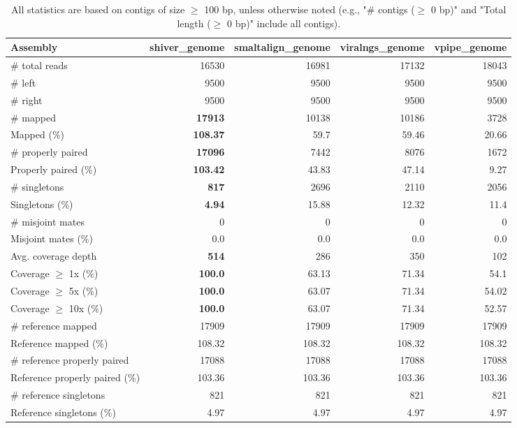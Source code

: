 \documentclass[12pt,a4paper]{article}
\begin{document}
\begin{table}[ht]
\begin{center}
\caption{All statistics are based on contigs of size $\geq$ 100 bp, unless otherwise noted (e.g., "\# contigs ($\geq$ 0 bp)" and "Total length ($\geq$ 0 bp)" include all contigs).}
\begin{tabular}{|l*{4}{|r}|}
\hline
Assembly & shiver\_genome & smaltalign\_genome & viralngs\_genome & vpipe\_genome \\ \hline
\# total reads & 16530 & 16981 & 17132 & 18043 \\ \hline
\# left & 9500 & 9500 & 9500 & 9500 \\ \hline
\# right & 9500 & 9500 & 9500 & 9500 \\ \hline
\# mapped & {\bf 17913} & 10138 & 10186 & 3728 \\ \hline
Mapped (\%) & {\bf 108.37} & 59.7 & 59.46 & 20.66 \\ \hline
\# properly paired & {\bf 17096} & 7442 & 8076 & 1672 \\ \hline
Properly paired (\%) & {\bf 103.42} & 43.83 & 47.14 & 9.27 \\ \hline
\# singletons & {\bf 817} & 2696 & 2110 & 2056 \\ \hline
Singletons (\%) & {\bf 4.94} & 15.88 & 12.32 & 11.4 \\ \hline
\# misjoint mates & 0 & 0 & 0 & 0 \\ \hline
Misjoint mates (\%) & 0.0 & 0.0 & 0.0 & 0.0 \\ \hline
Avg. coverage depth & {\bf 514} & 286 & 350 & 102 \\ \hline
Coverage $\geq$ 1x (\%) & {\bf 100.0} & 63.13 & 71.34 & 54.1 \\ \hline
Coverage $\geq$ 5x (\%) & {\bf 100.0} & 63.07 & 71.34 & 54.02 \\ \hline
Coverage $\geq$ 10x (\%) & {\bf 100.0} & 63.07 & 71.34 & 52.57 \\ \hline
\# reference mapped & 17909 & 17909 & 17909 & 17909 \\ \hline
Reference mapped (\%) & 108.32 & 108.32 & 108.32 & 108.32 \\ \hline
\# reference properly paired & 17088 & 17088 & 17088 & 17088 \\ \hline
Reference properly paired (\%) & 103.36 & 103.36 & 103.36 & 103.36 \\ \hline
\# reference singletons & 821 & 821 & 821 & 821 \\ \hline
Reference singletons (\%) & 4.97 & 4.97 & 4.97 & 4.97 \\ \hline

\end{tabular}
\end{center}
\end{table}
\end{document}
